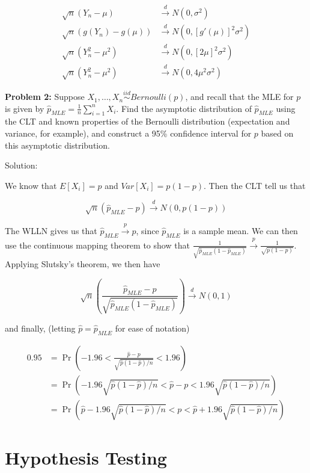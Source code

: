 \documentclass[
  letterpaper,
  DIV=11,
  numbers=noendperiod]{scrreprt}
\begin{document}
\begin{align*}
    \sqrt{n}(Y_n - \mu) & \overset{d}{\to} N(0, \sigma^2) \\
    \sqrt{n}(g(Y_n) - g(\mu)) & \overset{d}{\to} N(0, [g'(\mu)]^2\sigma^2) \\
    \sqrt{n}(Y_n^2 - \mu^2) & \overset{d}{\to} N(0, [2\mu]^2\sigma^2) \\
    \sqrt{n}(Y_n^2 - \mu^2) & \overset{d}{\to} N(0, 4 \mu^2\sigma^2)
\end{align*}

\textbf{Problem 2:} Suppose
\(X_1, \dots, X_n \overset{iid}{\sim} Bernoulli(p)\), and recall that
the MLE for \(p\) is given by
\(\hat{p}_{MLE} = \frac{1}{n} \sum_{i = 1}^n X_i\). Find the asymptotic
distribution of \(\hat{p}_{MLE}\) using the CLT and known properties of
the Bernoulli distribution (expectation and variance, for example), and
construct a 95\% confidence interval for \(p\) based on this asymptotic
distribution.

Solution:

We know that \(E[X_i] = p\) and \(Var[X_i] = p(1-p)\). Then the CLT tell
us that

\[
\sqrt{n}(\hat{p}_{MLE} - p) \overset{d}{\to} N(0, p(1-p))
\]

The WLLN gives us that \(\hat{p}_{MLE} \overset{p}{\to} p\), since
\(\hat{p}_{MLE}\) is a sample mean. We can then use the continuous
mapping theorem to show that
\(\frac{1}{\sqrt{\hat{p}_{MLE}(1-\hat{p}_{MLE})}} \overset{p}{\to} \frac{1}{\sqrt{p(1 - p)}}\).
Applying Slutsky's theorem, we then have

\[
\sqrt{n}\left(\frac{\hat{p}_{MLE} - p}{\sqrt{\hat{p}_{MLE}(1-\hat{p}_{MLE})}}\right) \overset{d}{\to} N(0, 1)
\]

and finally, (letting \(\hat{p} = \hat{p}_{MLE}\) for ease of notation)

\begin{align*}
    0.95 & = \Pr\left(-1.96 < \frac{\hat{p} - p}{\sqrt{\hat{p}(1-\hat{p})/n}}  < 1.96\right)  \\
    & = \Pr\left(-1.96\sqrt{\hat{p}(1-\hat{p})/n} < \hat{p} - p  < 1.96\sqrt{\hat{p}(1-\hat{p})/n}\right) \\
    & = \Pr\left(\hat{p} -1.96\sqrt{\hat{p}(1-\hat{p})/n} <  p  < \hat{p} + 1.96\sqrt{\hat{p}(1-\hat{p})/n}\right)
\end{align*}


\chapter{Hypothesis Testing}\label{hypothesis-testing}
\end{document}

